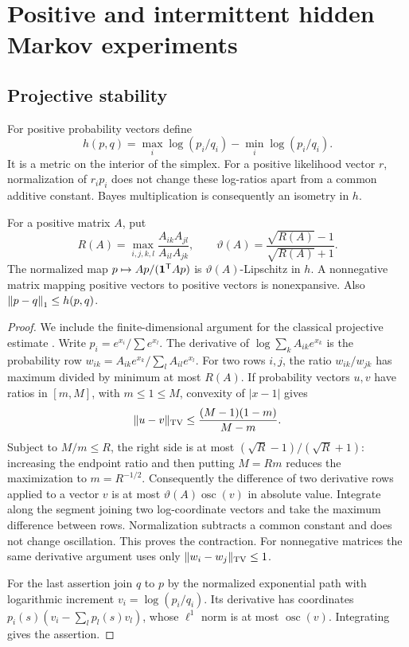 \section{Positive and intermittent hidden Markov experiments}
\label{sec:v2-hmm}
\subsection{Projective stability}
For positive probability vectors define
\[
 h(p,q)=\max_i\log(p_i/q_i)-\min_i\log(p_i/q_i).
\]
It is a metric on the interior of the simplex. For a positive likelihood
vector $r$, normalization of $r_ip_i$ does not change these log-ratios
apart from a common additive constant. Bayes multiplication is consequently
an isometry in $h$.

\begin{lemma}\label{lem:v2-projective}
For a positive matrix $A$, put
\[
 R(A)=\max_{i,j,k,l}\frac{A_{ik}A_{jl}}{A_{il}A_{jk}},
 \qquad \vartheta(A)=\frac{\sqrt{R(A)}-1}{\sqrt{R(A)}+1}.
\]
The normalized map $p\mapsto Ap/(\mathbf 1^{\mathsf T}Ap)$ is
$\vartheta(A)$-Lipschitz in $h$. A nonnegative matrix mapping positive
vectors to positive vectors is nonexpansive. Also
$\left\lVert p-q\right\rVert_1\le h(p,q)$.
\end{lemma}
\begin{proof}
We include the finite-dimensional argument for the classical projective
estimate \cite{Bushell1973}. Write $p_i=e^{x_i}/\sum e^{x_l}$.
The derivative of $\log\sum_k A_{ik}e^{x_k}$ is the probability row
$w_{ik}=A_{ik}e^{x_k}/\sum_l A_{il}e^{x_l}$. For two rows $i,j$, the
ratio $w_{ik}/w_{jk}$ has maximum divided by minimum at most $R(A)$.
If probability vectors $u,v$ have ratios in $[m,M]$, with $m\le1\le M$,
convexity of $|x-1|$ gives
\[
 \|u-v\|_{\mathrm{TV}}\le\frac{(M-1)(1-m)}{M-m}.
\]
Subject to $M/m\le R$, the right side is at most
$(\sqrt R-1)/(\sqrt R+1)$: increasing the endpoint ratio and then
putting $M=Rm$ reduces the maximization to $m=R^{-1/2}$.
Consequently the difference of two derivative rows applied to a vector
$v$ is at most $\vartheta(A)\operatorname{osc}(v)$ in absolute value.
Integrate along the segment joining two log-coordinate vectors and take
the maximum difference between rows. Normalization subtracts a common
constant and does not change oscillation. This proves the contraction.
For nonnegative matrices the same derivative argument uses only
$\|w_i-w_j\|_{\mathrm{TV}}\le1$.

For the last assertion join $q$ to $p$ by the normalized exponential
path with logarithmic increment $v_i=\log(p_i/q_i)$. Its derivative has
coordinates $p_i(s)(v_i-\sum_l p_l(s)v_l)$, whose $\ell^1$ norm is at
most $\operatorname{osc}(v)$. Integrating gives the assertion.
\end{proof}

